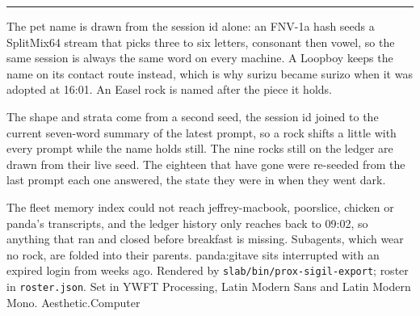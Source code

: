 \documentclass[10pt]{article}
\newcommand{\acdot}{{\color{acpink}.}}
\newcommand{\ac}{Aesthetic{\acdot}Computer}
\begin{document}
\vspace{0.5em}
{\color{acdark}\rule{\linewidth}{3pt}}\par\vspace{0.45em}
\begin{minipage}[t]{0.315\linewidth}\vspace{0pt}
{\ttfamily\fontsize{7.6pt}{9pt}\selectfont\color{acpink}\par}\vspace{0.3em}
{\fontsize{7.9pt}{9.6pt}\selectfont\color{acgray}\RaggedRight
The pet name is drawn from the session id alone: an FNV-1a hash seeds a SplitMix64 stream that picks three to six letters, consonant then vowel, so the same session is always the same word on every machine. A Loopboy keeps the name on its contact route instead, which is why surizu became surizo when it was adopted at 16:01. An Easel rock is named after the piece it holds.\par}
\end{minipage}\hfill
\begin{minipage}[t]{0.315\linewidth}\vspace{0pt}
{\ttfamily\fontsize{7.6pt}{9pt}\selectfont\color{acpink}\par}\vspace{0.3em}
{\fontsize{7.9pt}{9.6pt}\selectfont\color{acgray}\RaggedRight
The shape and strata come from a second seed, the session id joined to the current seven-word summary of the latest prompt, so a rock shifts a little with every prompt while the name holds still. The nine rocks still on the ledger are drawn from their live seed. The eighteen that have gone were re-seeded from the last prompt each one answered, the state they were in when they went dark.\par}
\end{minipage}\hfill
\begin{minipage}[t]{0.315\linewidth}\vspace{0pt}
{\ttfamily\fontsize{7.6pt}{9pt}\selectfont\color{acpink}\par}\vspace{0.3em}
{\fontsize{7.9pt}{9.6pt}\selectfont\color{acgray}\RaggedRight
The fleet memory index could not reach jeffrey-macbook, poorslice, chicken or panda's transcripts, and the ledger history only reaches back to 09:02, so anything that ran and closed before breakfast is missing. Subagents, which wear no rock, are folded into their parents. panda:gitave sits interrupted with an expired login from weeks ago. Rendered by \texttt{slab/bin/prox-sigil-export}; roster in \texttt{roster.json}. Set in YWFT Processing, Latin Modern Sans and Latin Modern Mono. \ac{}\par}
\end{minipage}\par
\end{document}
